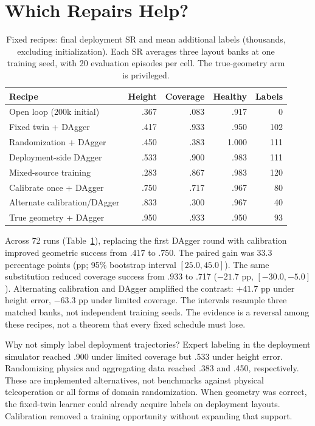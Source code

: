 \clearpage
\section{Which Repairs Help?}
\begin{table}[t]
\centering\caption{Fixed recipes: final deployment SR and mean additional labels (thousands, excluding initialization). Each SR averages three layout banks at one training seed, with 20 evaluation episodes per cell. The true-geometry arm is privileged.}\label{tab:recipe}
\begin{tabular}{@{}lrrrr@{}}\toprule
Recipe & Height & Coverage & Healthy & Labels\\\midrule
Open loop (200k initial) & .367 & .083 & .917 & 0\\
Fixed twin + DAgger & .417 & .933 & .950 & 102\\
Randomization + DAgger & .450 & .383 & 1.000 & 111\\
Deployment-side DAgger & .533 & .900 & .983 & 111\\
Mixed-source training & .283 & .867 & .983 & 120\\
Calibrate once + DAgger & .750 & .717 & .967 & 80\\
Alternate calibration/DAgger & .833 & .300 & .967 & 40\\
True geometry + DAgger & .950 & .933 & .950 & 93\\\bottomrule
\end{tabular}
\end{table}
Across 72 runs (Table~\ref{tab:recipe}), replacing the first DAgger round with calibration improved geometric success from .417 to .750. The paired gain was 33.3 percentage points (pp; 95\% bootstrap interval $[25.0,45.0]$). The same substitution reduced coverage success from .933 to .717 ($-21.7$ pp, $[-30.0,-5.0]$). Alternating calibration and DAgger amplified the contrast: $+41.7$ pp under height error, $-63.3$ pp under limited coverage. The intervals resample three matched banks, not independent training seeds. The evidence is a reversal among these recipes, not a theorem that every fixed schedule must lose.

Why not simply label deployment trajectories? Expert labeling in the deployment simulator reached .900 under limited coverage but .533 under height error. Randomizing physics and aggregating data reached .383 and .450, respectively. These are implemented alternatives, not benchmarks against physical teleoperation or all forms of domain randomization. When geometry was correct, the fixed-twin learner could already acquire labels on deployment layouts. Calibration removed a training opportunity without expanding that support.


